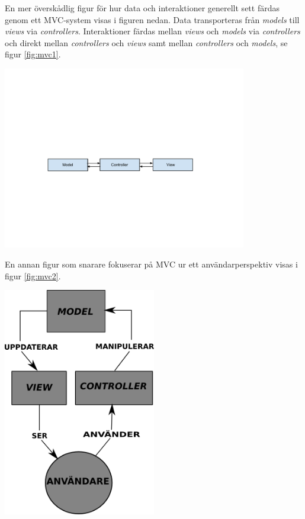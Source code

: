 En mer överskådlig figur för hur data och interaktioner generellt sett färdas genom ett MVC-system visas i figuren nedan. Data transporteras från \textit{models} till \textit{views} via \textit{controllers}. Interaktioner färdas mellan \textit{views} och \textit{models} via \textit{controllers} och direkt mellan \textit{controllers} och \textit{views} samt mellan \textit{controllers} och \textit{models}, se figur \ref{fig:mvc1}.

\begin{Figure}
  \centering
    \includegraphics[width=0.8\textwidth]{figures/mvc1.pdf}
\end{Figure}

En annan figur som snarare fokuserar på MVC ur ett användarperspektiv visas i figur \ref{fig:mvc2}.

\begin{Figure}
  \centering
    \includegraphics[width=0.5\textwidth]{figures/mvc2.png}
\end{Figure}


